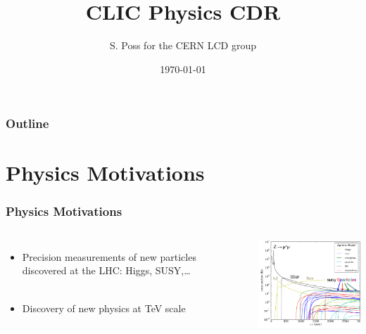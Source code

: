 \documentclass{beamer}
\author{S. Poss for the CERN LCD group}
\institute[CERN]{CERN}
\title[]{CLIC Physics CDR}
\date{\today}
\begin{document}
\begin{frame}
	\titlepage
\end{frame}

\begin{frame}
\frametitle{Outline}
\tableofcontents
\end{frame}


\section{Physics Motivations}
\begin{frame}
\frametitle{Physics Motivations}
\begin{columns}[c]
\column{6cm}
\begin{itemize} 
  \item \alert{Precision measurements} of new particles discovered at the LHC:
  Higgs, SUSY,\ldots\\
  ~\\ 
  \item \alert{Discovery} of new physics at TeV scale
\end{itemize}
\column{6cm}
\includegraphics[width=6cm]{models}
\end{columns}
\end{frame}
\end{document}
